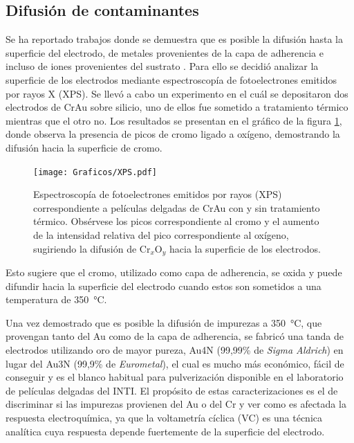 	\subsection{Difusión de contaminantes}

			Se ha reportado trabajos donde se demuestra que es posible la difusión hasta la superficie del electrodo, de metales provenientes de la capa de adherencia e incluso de iones provenientes del sustrato \cite{Alonso1990,Moody2003}. Para ello se decidió analizar la superficie de los electrodos mediante espectroscopía de fotoelectrones emitidos por rayos X (XPS). Se llevó a cabo un experimento en el cuál se depositaron dos electrodos de Cr\textbar Au sobre silicio, uno de ellos fue sometido a tratamiento térmico mientras que el otro no. Los resultados se presentan en el gráfico de la figura \ref{fig:XPS}, donde observa la presencia de picos de cromo ligado a oxígeno, demostrando la difusión hacia la superficie de cromo.
				
				\begin{figure}[hb!]
		 	       	\begin{center}
		 	       	\texttt{[image: Graficos/XPS.pdf]}
		        	\caption[XPS de películas delgadas de Cr\textbar Au]{Espectroscopía de fotoelectrones emitidos por rayos (XPS) correspondiente a películas delgadas de Cr\textbar Au con y sin tratamiento térmico. Obsérvese los picos correspondiente al cromo y el aumento de la intensidad relativa del pico correspondiente al oxígeno, sugiriendo la difusión de Cr$_x$O$_y$ hacia la superficie de los electrodos.}
		         	\label{fig:XPS}
		         	\end{center}
		     		\end{figure}

			Esto sugiere que el cromo, utilizado como capa de adherencia, se oxida y puede difundir hacia la superficie del electrodo cuando estos son sometidos a una temperatura de \SI{350}{\celsius}.

			Una vez demostrado que es posible la difusión de impurezas a \SI{350}{\celsius}, que provengan tanto del Au como de la capa de adherencia, se fabricó una tanda de electrodos utilizando oro de mayor pureza, Au4N (99,99\% de \textit{Sigma Aldrich}) en lugar del Au3N (99,9\% de \textit{Eurometal}), el cual es mucho más económico, fácil de conseguir y es el blanco habitual para pulverización disponible en el laboratorio de películas delgadas del INTI. El propósito de estas caracterizaciones es el de discriminar si las impurezas provienen del Au o del Cr y ver como es afectada la respuesta electroquímica, ya que la voltametría cíclica (VC) es una técnica analítica cuya respuesta depende fuertemente de la superficie del electrodo.\cite{Wi2000,Pumera2007,Gewirth2004,Villullas2000}


